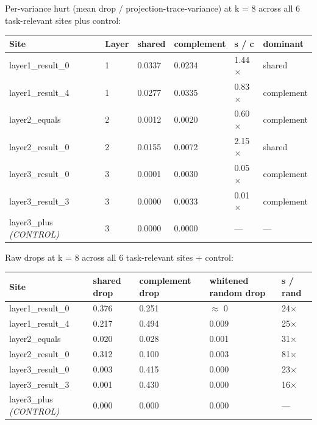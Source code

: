 Per-variance hurt (mean drop / projection-trace-variance) at k = 8 across
all 6 task-relevant sites plus control:

\begin{center}
\begin{tabular}{|l|l|l|l|l|l|}
\hline
\textbf{Site} & \textbf{Layer} & \textbf{shared} & \textbf{complement} & \textbf{s / c} & \textbf{dominant} \\
\hline
layer1\_result\_0 & 1 & 0.0337 & 0.0234 & 1.44$\times$ & shared \\
layer1\_result\_4 & 1 & 0.0277 & 0.0335 & 0.83$\times$ & complement \\
layer2\_equals & 2 & 0.0012 & 0.0020 & 0.60$\times$ & complement \\
layer2\_result\_0 & 2 & 0.0155 & 0.0072 & 2.15$\times$ & shared \\
layer3\_result\_0 & 3 & 0.0001 & 0.0030 & 0.05$\times$ & complement \\
layer3\_result\_3 & 3 & 0.0000 & 0.0033 & 0.01$\times$ & complement \\
layer3\_plus \emph{(CONTROL)} & 3 & 0.0000 & 0.0000 & --- & --- \\
\hline
\end{tabular}
\end{center}


Raw drops at k = 8 across all 6 task-relevant sites + control:

\begin{center}
\begin{tabular}{|l|l|l|l|l|}
\hline
\textbf{Site} & \textbf{shared drop} & \textbf{complement drop} & \textbf{whitened random drop} & \textbf{s / rand} \\
\hline
layer1\_result\_0 & 0.376 & 0.251 & $\approx$ 0 & 24$\times$ \\
layer1\_result\_4 & 0.217 & 0.494 & 0.009 & 25$\times$ \\
layer2\_equals & 0.020 & 0.028 & 0.001 & 31$\times$ \\
layer2\_result\_0 & 0.312 & 0.100 & 0.003 & 81$\times$ \\
layer3\_result\_0 & 0.003 & 0.415 & 0.000 & 23$\times$ \\
layer3\_result\_3 & 0.001 & 0.430 & 0.000 & 16$\times$ \\
layer3\_plus \emph{(CONTROL)} & 0.000 & 0.000 & 0.000 & --- \\
\hline
\end{tabular}
\end{center}



